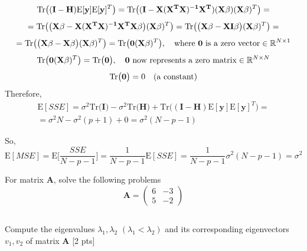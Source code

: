 \documentclass{homework}
\begin{document}
    \begin{equation*}
    \begin{gathered}
        \text{Tr}\big( \mathbf{(I-H)}\text{E}[\mathbf{y}]\text{E}[\mathbf{y}]^T\big) =
        \text{Tr}\big( \mathbf{(I-X(X^TX)^{-1}X^T)}(\mathbf{X\beta})(\mathbf{X\beta})^T\big) = \\[4pt]
        = \text{Tr}\big( \big(\mathbf{X\beta-X(X^TX)^{-1}X^TX\beta}\big)(\mathbf{X\beta})^T\big) = \text{Tr}\big( \big(\mathbf{X\beta-XI\beta}\big)(\mathbf{X\beta})^T\big) = \\[4pt]
        = \text{Tr}\big(\big(\mathbf{X\beta-X\beta}\big)(\mathbf{X\beta})^T\big) = 
        \text{Tr}\big(\mathbf{0}(\mathbf{X\beta})^T\big), \quad \text{where \textbf{0} is a zero vector} \in \mathbb{R}^{N\times 1}\\[4pt]
        \text{Tr}\big(\mathbf{0}(\mathbf{X\beta})^T\big) = 
        \text{Tr}\big(\mathbf{0}\big), \quad \text{\textbf{0} now represents a zero matrix} \in \mathbb{R}^{N\times N} \\[4pt]
        \text{Tr}\big(\mathbf{0}\big) = 0 \quad \text{(a constant)}
    \end{gathered}
    \end{equation*}
    Therefore,
    \begin{equation*}
        \begin{gathered}
        \text{E}[SSE] = \sigma^2\text{Tr}\big(\mathbf{I}\big) - \sigma^2\text{Tr}\big(\mathbf{H}\big) + \text{Tr}\big( \mathbf{(I-H)}\text{E}[\mathbf{y}]\text{E}[\mathbf{y}]^T\big) = \\[4pt]
        = \sigma^2N - \sigma^2(p+1) + 0 = \sigma^2(N - p - 1)
        \end{gathered}
    \end{equation*}
    
    So, $\text{E}[MSE] = \text{E}\Big[\dfrac{SSE}{N-p-1}\Big] = \dfrac{1}{N-p-1}\text{E}[SSE] = \dfrac{1}{N-p-1}\sigma^2(N - p - 1) = \sigma^2$
    
    \vspace{5mm}

    \exercise*
    For matrix \textbf{A}, solve the following problems
    $$ \textbf{A} = \left( \begin{matrix} 6 & -3 \\ 5 & -2 \end{matrix} \right) $$

    \subsection{}
    Compute the eigenvalues $\lambda_{1}, \lambda_{2}$  $(\lambda_{1} < \lambda_{2})$ and its corresponding eigenvectors $v_{1}, v_{2}$ of matrix \textbf{A} [2 pts]
    
\end{document}
